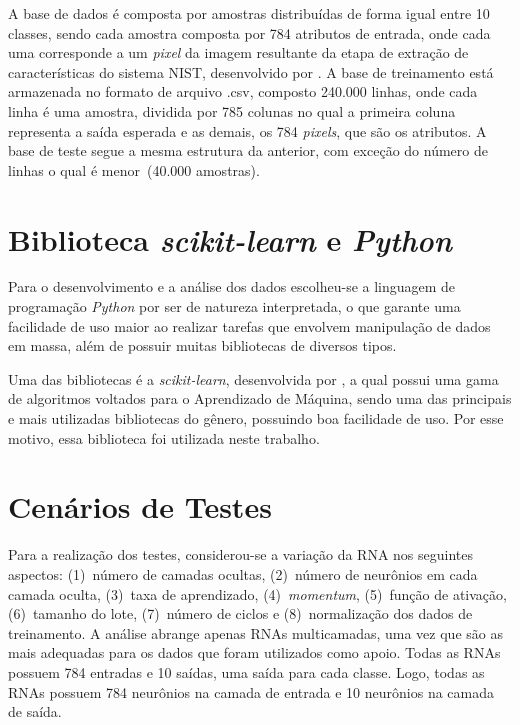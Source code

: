 \documentclass[12pt,oneside,a4paper,chapter=TITLE,section=TITLE,sumario
		=tradicional]{abntex2}
\begin{document}
		
		A base de dados é composta por amostras distribuídas de forma igual entre 10 classes, sendo cada amostra composta por 784 atributos de entrada, onde cada uma corresponde a um \textit{pixel} da imagem resultante da etapa de extração de características do sistema NIST, desenvolvido por . A base de treinamento está armazenada no formato de arquivo .csv, composto 240.000 linhas, onde cada linha é uma amostra, dividida por 785 colunas no qual a primeira coluna representa a saída esperada e as demais, os 784 \textit{pixels}, que são os atributos. A base de teste segue a mesma estrutura da anterior, com exceção do número de linhas o qual é menor~(40.000 amostras).
		
		\section{Biblioteca \textit{scikit-learn} e \textit{Python}}
		
		Para o desenvolvimento e a análise dos dados escolheu-se a linguagem de programação \textit{Python} por ser de natureza interpretada, o que garante uma facilidade de uso maior ao realizar tarefas que envolvem manipulação de dados em massa, além de possuir muitas bibliotecas de diversos tipos. 
		
		Uma das bibliotecas é a \textit{scikit-learn}, desenvolvida por , a qual possui uma gama de algoritmos voltados para o Aprendizado de Máquina, sendo uma das principais e mais utilizadas bibliotecas do gênero, possuindo boa facilidade de uso. Por esse motivo, essa biblioteca foi utilizada neste trabalho.
			
		\section{Cenários de Testes}
		\label{sec:cenarios}
		Para a realização dos testes, considerou-se a variação da RNA nos seguintes aspectos: (1)~número de camadas ocultas, (2)~número de neurônios em cada camada oculta, (3)~taxa de aprendizado, (4)~\textit{momentum}, (5)~função de ativação, (6)~tamanho do lote, (7)~número de ciclos e (8)~normalização dos dados de treinamento. A análise abrange apenas RNAs multicamadas, uma vez que são as mais adequadas para os dados que foram utilizados como apoio. Todas as RNAs possuem 784 entradas e 10 saídas, uma saída para cada classe. Logo, todas as RNAs possuem 784 neurônios na camada de entrada e 10 neurônios na camada de saída.
		
\end{document}
